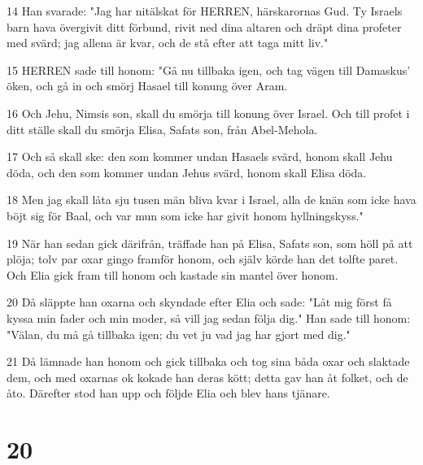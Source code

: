 \par 14 Han svarade: "Jag har nitälskat för HERREN, härskarornas Gud. Ty Israels barn hava övergivit ditt förbund, rivit ned dina altaren och dräpt dina profeter med svärd; jag allena är kvar, och de stå efter att taga mitt liv."
\par 15 HERREN sade till honom: "Gå nu tillbaka igen, och tag vägen till Damaskus' öken, och gå in och smörj Hasael till konung över Aram.
\par 16 Och Jehu, Nimsis son, skall du smörja till konung över Israel. Och till profet i ditt ställe skall du smörja Elisa, Safats son, från Abel-Mehola.
\par 17 Och så skall ske: den som kommer undan Hasaels svärd, honom skall Jehu döda, och den som kommer undan Jehus svärd, honom skall Elisa döda.
\par 18 Men jag skall låta sju tusen män bliva kvar i Israel, alla de knän som icke hava böjt sig för Baal, och var mun som icke har givit honom hyllningskyss."
\par 19 När han sedan gick därifrån, träffade han på Elisa, Safats son, som höll på att plöja; tolv par oxar gingo framför honom, och själv körde han det tolfte paret. Och Elia gick fram till honom och kastade sin mantel över honom.
\par 20 Då släppte han oxarna och skyndade efter Elia och sade: "Låt mig först få kyssa min fader och min moder, så vill jag sedan följa dig." Han sade till honom: "Välan, du må gå tillbaka igen; du vet ju vad jag har gjort med dig."
\par 21 Då lämnade han honom och gick tillbaka och tog sina båda oxar och slaktade dem, och med oxarnas ok kokade han deras kött; detta gav han åt folket, och de åto. Därefter stod han upp och följde Elia och blev hans tjänare.

\chapter{20}

